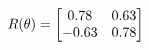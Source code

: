 \documentclass[preview]{standalone}
\begin{document}
\begin{align*}
\special{dvisvgm:raw <g id='unique000'>}R(\theta) = \begin{bmatrix}0.78 & 0.63\\-0.63 & 0.78\end{bmatrix}\special{dvisvgm:raw </g>}
\end{align*}
\end{document}
